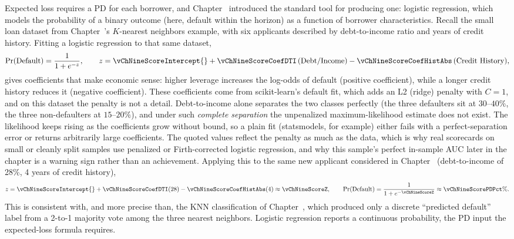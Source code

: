 \documentclass[../ai_in_finance]{subfiles}
\begin{document}
Expected loss requires a PD for each borrower, and Chapter~ introduced the standard tool for producing one: logistic regression, which models the probability of a binary outcome (here, default within the horizon) as a function of borrower characteristics. Recall the small loan dataset from Chapter~'s $K$-nearest neighbors example, with six applicants described by debt-to-income ratio and years of credit history. Fitting a logistic regression to that same dataset,
\begin{equation*}
\Pr(\text{Default}) = \frac{1}{1+e^{-z}}, \qquad z = \vChNineScoreIntercept{} + \vChNineScoreCoefDTI\,(\text{Debt/Income}) - \vChNineScoreCoefHistAbs\,(\text{Credit History}),
\end{equation*}
gives coefficients that make economic sense: higher leverage increases the log-odds of default (positive coefficient), while a longer credit history reduces it (negative coefficient).
These coefficients come from scikit-learn's default fit, which adds an L2 (ridge) penalty with $C=1$, and on this dataset the penalty is not a detail. Debt-to-income alone separates the two classes perfectly (the three defaulters sit at $30$--$40\%$, the three non-defaulters at $15$--$20\%$), and under such \emph{complete separation} the unpenalized maximum-likelihood estimate does not exist. The likelihood keeps rising as the coefficients grow without bound, so a plain fit (statsmodels, for example) either fails with a perfect-separation error or returns arbitrarily large coefficients. The quoted values reflect the penalty as much as the data, which is why real scorecards on small or cleanly split samples use penalized or Firth-corrected logistic regression, and why this sample's perfect in-sample AUC later in the chapter is a warning sign rather than an achievement.
Applying this to the same new applicant considered in Chapter~ (debt-to-income of 28\%, 4 years of credit history),
\begin{equation*}
z = \vChNineScoreIntercept{} + \vChNineScoreCoefDTI(28) - \vChNineScoreCoefHistAbs(4) \approx \vChNineScoreZ, \qquad \Pr(\text{Default}) = \frac{1}{1+e^{-\vChNineScoreZ}} \approx \vChNineScorePDPct\%.
\end{equation*}
This is consistent with, and more precise than, the KNN classification of Chapter~, which produced only a discrete ``predicted default'' label from a 2-to-1 majority vote among the three nearest neighbors. Logistic regression reports a continuous probability, the PD input the expected-loss formula requires.
\end{document}
